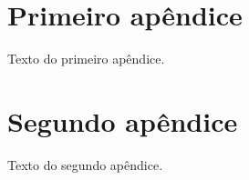 \documentclass[12pt,oneside,a4paper,chapter=TITLE,english,brazil]{abntex2}
\begin{document}
\begin{apendicesenv}


\chapter{Primeiro apêndice}

Texto do primeiro apêndice.


\chapter{Segundo apêndice}

Texto do segundo apêndice.

\end{apendicesenv}



\end{document}

